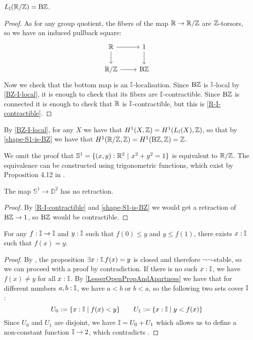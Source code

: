 \begin{proposition}\label{shape-S1-is-BZ}
$L_{\mathbb{I}}(\mathbb{R}/\mathbb{Z}) = \mathrm{B}\mathbb{Z}$.
\end{proposition}

\begin{proof}
As for any group quotient, the fibers of the map $\mathbb{R}\to\mathbb{R}/\mathbb{Z}$ are $\mathbb{Z}$-torsors, so we have an induced pullback square:
\[
\begin{tikzcd}
\R\ar[r]\ar[d] & 1\ar[d] \\
\R/\Z\ar[r] & \B\Z
\end{tikzcd}
\]
Now we check that the bottom map is an $\mathbb{I}$-localisation. Since $\mathrm{B}\mathbb{Z}$ is $\mathbb{I}$-local by \cref{BZ-I-local}, it is enough to check that its fibers are $\mathbb{I}$-contractible. Since $\mathrm{B}\mathbb{Z}$ is connected it is enough to check that $\mathbb{R}$ is $\mathbb{I}$-contractible, but this is \cref{R-I-contractible}.
\end{proof}

\begin{remark}
By \cref{BZ-I-local}, for any $X$ we have that $H^1(X,\mathbb{Z}) = H^1(L_{\mathbb{I}}(X),\mathbb{Z})$, so that by \cref{shape-S1-is-BZ} we have that $H^1(\mathbb{R}/\mathbb{Z},\mathbb{Z}) = H^1(\mathrm{B}\mathbb{Z},\mathbb{Z}) = \mathbb{Z}$.
\end{remark}

We omit the proof that $\mathbb{S}^1=\{(x,y):\R^2\ \vert\ x^2+y^2=1\}$ is equivalent to $\mathbb{R}/\mathbb{Z}$.
The equivalence can be constructed using trigonometric functions, which exist by Proposition 4.12 in \cite{Bishop}.

\begin{proposition}
\label{no-retraction}
The map $\mathbb{S}^1\to \mathbb{D}^2$ has no retraction.
\end{proposition}

\begin{proof}
By \cref{R-I-contractible} and \cref{shape-S1-is-BZ} we would get a retraction of $\mathrm{B}\mathbb{Z}\to 1$, so $\mathrm{B}\mathbb{Z}$ would be contractible.
\end{proof}

\begin{theorem}
  \label{ivt}
  For any $f: \mathbb{I}\to \mathbb{I}$ and $y:\mathbb{I}$ such that $f(0)\leq y$ and $y\leq f(1)$,
  there exists $x:\mathbb{I}$ such that $f(x)=y$.
\end{theorem}

\begin{proof}
  By , the proposition $\exists x:\mathbb{I}.f(x)=y$ is closed and therefore $\neg\neg$-stable, so we can proceed with a proof by contradiction.
  If there is no such $x:\mathbb{I}$, we have $f(x)\neq y$ for all $x:\mathbb{I}$.
  By \cref{LesserOpenPropAndApartness} we have that for different numbers $a,b:\mathbb{I}$, we have $a<b$ or $b<a$, so the following two sets cover $\mathbb{I}$:
  \[
    U_0:= \{x:\mathbb{I}\mid f(x)<y\} \quad\quad
    U_1:= \{x:\mathbb{I}\mid y<f(x)\}
    \]
  Since $U_0$ and $U_1$ are disjoint, we have $\mathbb{I}=U_0+U_1$ which allows us to define a non-constant function $\mathbb{I}\to 2$, which contradicts .
\end{proof}


